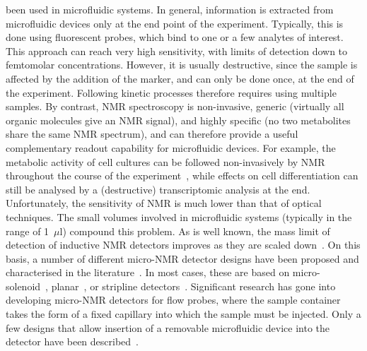 \documentclass[preprint,5p]{elsarticle}
\begin{document}
been used in microfluidic systems. In general, information is extracted from
microfluidic devices only at the end point of the experiment. Typically, this is
done using fluorescent probes, which bind to one or a few analytes of interest.
This approach can reach very high sensitivity, with limits of detection down to
femtomolar concentrations. However, it is usually destructive, since the sample
is affected by the addition of the marker, and can only be done once, at the end
of the experiment. Following kinetic processes therefore requires using multiple
samples. By contrast, NMR spectroscopy is non-invasive, generic (virtually all
organic molecules give an NMR signal), and highly specific (no two metabolites
share the same NMR spectrum), and can therefore provide a useful complementary
readout capability for microfluidic devices. For example, the metabolic activity
of cell cultures can be followed non-invasively by NMR throughout the course of
the experiment~\cite{cellnmr-2015}, while effects on cell differentiation can
still be analysed by a (destructive) transcriptomic analysis at the end.
Unfortunately, the sensitivity of NMR is much lower than that of optical
techniques. The small volumes involved in microfluidic systems (typically in the
range of 1~$\mu$l) compound this problem. As is well known, the mass limit of
detection of inductive NMR detectors improves as they are scaled
down~\cite{Olson1995}. On this basis, a number of different micro-NMR detector
designs have been proposed and characterised in the
literature~\cite{utz2012review,micronmr2014review}. In most cases, these are
based on micro-solenoid~\cite{SUBRAMANIAN1998,Pines2007},
planar~\cite{Maguire2007,dieter2008,EHRMANN200}, or stripline
detectors~\cite{stripline_jan}. Significant research has gone into developing
micro-NMR detectors for flow probes, where the sample container takes the form
of a fixed capillary into which the sample must be injected. Only a few designs
that allow insertion of a removable microfluidic device into the detector have
been described~\cite{Spengler-2014,Spengler-2016,gream_2016}.
\end{document}
